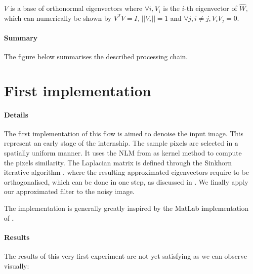 \(V\) is a base of orthonormal eigenvectors where \(\forall i, V_i\) is the \(i\)-th eigenvector of \(\hat{W}\), which can numerically be shown by \(V^T V = I\), \(||V_i|| = 1\) and \(\forall j, i \neq j, V_i V_j = 0\).

\paragraph{Summary}

The figure below summarises the described processing chain.


\section{First implementation}

\paragraph{Details}
The first implementation of this flow is aimed to denoise the input image.
This represent an early stage of the internship.
The sample pixels are selected in a spatially uniform manner.
It uses the NLM from \cite{buades_review_2005} as kernel method to compute the pixels similarity.
The Laplacian matrix is defined through the Sinkhorn iterative algorithm \cite{milanfar_symmetrizing_2013}, where the resulting approximated eigenvectors require to be orthogonalised, which can be done in one step, as discussed in \cite{fowlkes_spectral_2004}.
We finally apply our approximated filter to the noisy image.

The implementation is generally greatly inspired by the MatLab implementation of \cite{glide_2014}.

\paragraph{Results}
The results of this very first experiment are not yet satisfying as we can observe visually:

